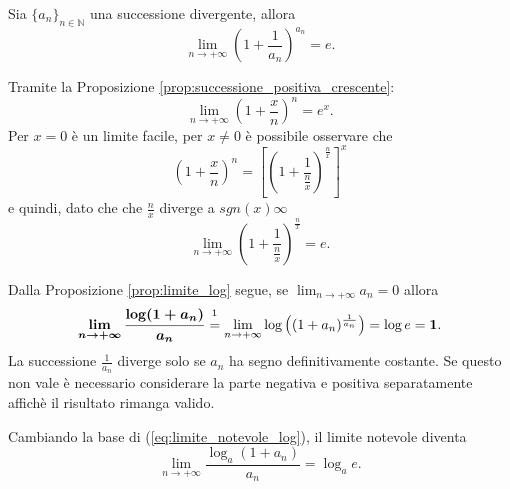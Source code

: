 \begin{corollary}
    Sia $\{a_n\}_{n\in\mathbb N}$ una successione divergente, allora
    \begin{equation*}
        \lim_{n\rightarrow+\infty}\left(1+\frac{1}{a_n}\right)^{a_n}=e.
    \end{equation*}
\end{corollary}

\begin{remark}
    Tramite la Proposizione \ref{prop:successione_positiva_crescente}:
    \begin{equation*}
        \lim_{n\rightarrow+\infty}\left(1+\frac{x}{n}\right)^{n}=e^x.
    \end{equation*}
    Per $x=0$ è un limite facile, per $x\neq 0$ è possibile osservare che
    \begin{equation*}
        \left(1+\frac{x}{n}\right)^n=\left[\left(1+\frac{1}{\frac{n}{x}}\right)^{\frac{n}{x}}\right]^x
    \end{equation*}
    e quindi, dato che che $\frac{n}{x}$ diverge a $sgn(x)\infty$
    \begin{equation*}
        \lim_{n\rightarrow+\infty}\left(1+\frac{1}{\frac{n}{x}}\right)^{\frac{n}{x}}=e.
    \end{equation*}
\end{remark}

\begin{remark}
    Dalla Proposizione \ref{prop:limite_log} segue, se $\lim_{n\rightarrow+\infty}a_n=0$ allora
    \begin{equation}\label{eq:limite_notevole_log}
        \boldsymbol{\lim_{n\rightarrow+\infty}\frac{\log(1+a_n)}{a_n}}\overset{\footnotemark}{=}\lim_{n\rightarrow+\infty}\log\left((1+a_n)^{\frac{1}{a_n}}\right)=\log e=\boldsymbol 1.
    \end{equation}
    La successione $\frac{1}{a_n}$ diverge solo se $a_n$ ha segno definitivamente costante. Se questo non vale è necessario considerare la parte negativa e positiva separatamente affichè il risultato rimanga valido.
\end{remark}


\begin{remark}
    Cambiando la base di (\ref{eq:limite_notevole_log}), il limite notevole diventa
    \begin{equation*}        \lim_{n\rightarrow+\infty}\frac{\log_a(1+a_n)}{a_n}=\log_a e.
    \end{equation*}
\end{remark}

